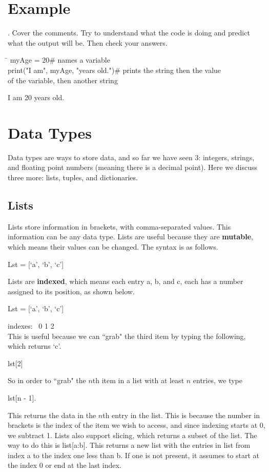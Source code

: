 \documentclass{article}
\newcommand{\define}[1]{\begin{center}\ttfamily #1\end{center}}
\newcommand{\icode}[1]{{\ttfamily #1}}
\begin{document}
\section{Example}
. Cover the comments. Try to understand what the code is doing and predict what the output will be. Then check your answers.
\vspace{1 mm}
\begin{tcolorbox}
	\ttfamily
	\begin{tabbing}
		\hspace{3.25 in}\=\hspace{3.25 in} \kill
		myAge = 20\>\# names a variable\\
		print("I am", myAge, "years old.")\>\# prints the string then the value \\
		\>\hspace{4 pt} of the variable, then another string
	\end{tabbing}
\end{tcolorbox}
\begin{tcolorbox}[colback=output]
	\ttfamily I am 20 years old.
\end{tcolorbox}

\section{Data Types}
Data types are ways to store data, and so far we have seen 3: integers, strings, and floating point numbers (meaning there is a decimal point). Here we discuss three more: lists, tuples, and dictionaries.
\subsection{Lists}
Lists store information in brackets, with comma-separated values. This information can be any data type. Lists are useful because they are \textbf{mutable}, which means their values can be changed. The syntax is as follows.
\define{Lst = [`a', `b', `c']}
Lists are \textbf{indexed}, which means each entry a, b, and c, each has a number assigned to its position, as shown below.
\define{Lst = [`a', `b', `c']}
\hspace{6.32 cm}indexes: \ 0 \hspace{.5 cm} 1 \hspace{.5 cm} 2\\
This is useful because we can ``grab" the third item by typing the following, which returns {\ttfamily `c'}.
\define{lst[2]}
So in order to ``grab" the $n$th item in a list with at least $n$ entries, we type
\define{lst[n - 1].}
This returns the data in the $n$th entry in the list. This is because the number in brackets is the index of the item we wish to access, and since indexing starts at 0, we subtract 1. Lists also support slicing, which returns a subset of the list. The way to do this is \icode{list[a:b]}. This returns a new list with the entries in \icode{list} from index \icode{a} to the index one less than \icode{b}. If one is not present, it assumes to start at the index 0 or end at the last index. 
\end{document}
